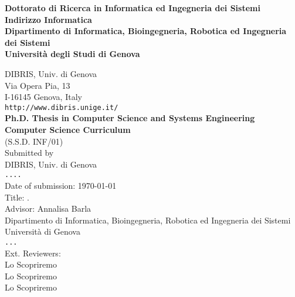 \documentclass{disithesis}
\begin{document}
\title{\longtitle}

\author{\me}



\maketitle

\begin{addresspage}
{\bf
Dottorato di Ricerca in Informatica ed Ingegneria dei Sistemi\\
Indirizzo Informatica\\
Dipartimento di Informatica, Bioingegneria, Robotica ed Ingegneria dei Sistemi \\
Universit\`a degli Studi di Genova\\[2ex]}

DIBRIS, Univ. di Genova\\
Via Opera Pia, 13\\
I-16145 Genova, Italy\\
{\tt http://www.dibris.unige.it/}\\[2ex]

{\bf
Ph.D. Thesis in Computer Science and Systems Engineering\\
Computer Science Curriculum}\\
(S.S.D. INF/01)\\[2ex]

Submitted by \me\\
DIBRIS, Univ. di Genova\\
{\tt ....}\\[2ex]

Date of submission:
\today\\[2ex]

Title:
\runningtitle.\\[2ex]

Advisor: %
Annalisa Barla\\
Dipartimento di Informatica, Bioingegneria, Robotica ed Ingegneria dei Sistemi\\
Universit\`a di Genova\\
{\tt ...}\\[2ex]

Ext. Reviewers:\\
Lo Scopriremo\\
Lo Scopriremo\\
Lo Scopriremo
\end{addresspage}
\end{document}

